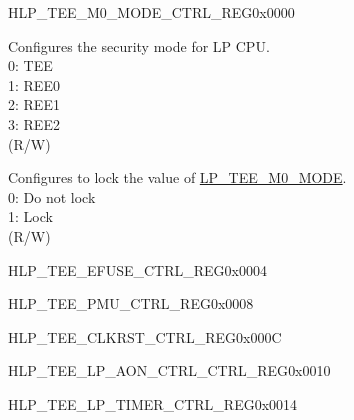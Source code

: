 \begin{register}{H}{LP\_TEE\_M0\_MODE\_CTRL\_REG}{0x0000}\label{regdesc:LPTEEM0MODECTRLREG}
%
%
%
\regnewline%
\begin{regdesc}\begin{reglist}
\label{fielddesc:LPTEEM0MODE}\item [LP\_TEE\_M0\_MODE] Configures the security mode for LP CPU.\\
0: TEE \\
1: REE0 \\
2: REE1 \\
3: REE2  \\
(R/W)
\label{fielddesc:LPTEEM0LOCK}\item [LP\_TEE\_M0\_LOCK] Configures to lock the value of \hyperref[fielddesc:LPTEEM0MODE]{LP\_TEE\_M0\_MODE}. \\
0: Do not lock \\
1: Lock  \\
(R/W)
\end{reglist}\end{regdesc}
\end{register}


\begin{register}{H}{LP\_TEE\_EFUSE\_CTRL\_REG}{0x0004}\label{regdesc:LPTEEEFUSECTRLREG}
\end{register}\vspace{-3em}

\begin{register}{H}{LP\_TEE\_PMU\_CTRL\_REG}{0x0008}\label{regdesc:LPTEEPMUCTRLREG}
\end{register}\vspace{-3em}

\begin{register}{H}{LP\_TEE\_CLKRST\_CTRL\_REG}{0x000C}\label{regdesc:LPTEECLKRSTCTRLREG}
\end{register}\vspace{-3em}

\begin{register}{H}{LP\_TEE\_LP\_AON\_CTRL\_CTRL\_REG}{0x0010}\label{regdesc:LPTEELPAONCTRLCTRLREG}
\end{register}\vspace{-3em}

\begin{register}{H}{LP\_TEE\_LP\_TIMER\_CTRL\_REG}{0x0014}\label{regdesc:LPTEELPTIMERCTRLREG}
\end{register}\vspace{-3em}

